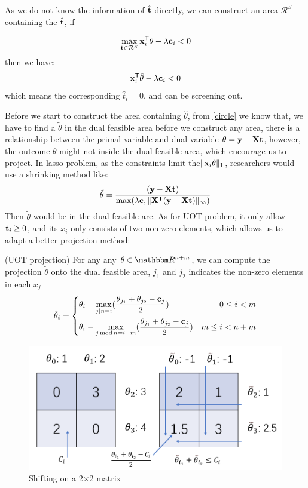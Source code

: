 As we do not know the information of $\hat{\mathbf t}$ directly, we can construct an area $\mathcal{R}^{S}$ containing the $\hat{\mathbf t}$, if

\begin{equation}
\max_{\mathbf t \in \mathcal{R}^S} \mathbf{x}_i^{\mathsf T}\theta -\lambda \mathbf c_i  < 0
\end{equation}
then we have:
 \begin{equation}
 \mathbf{x}_i^{\mathsf T}\hat{\theta} -\lambda \mathbf c_i  < 0
\end{equation}
which means the corresponding $\hat{t}_i = 0$, and can be screening out.

Before we start to construct the area containing $\hat{\theta}$, from \ref{circle} we know that, we have to find a $\tilde{\theta}$ in the dual feasible area before we construct any area, there is a relationship between the primal variable and dual variable $\theta = \mathbf y - \mathbf{X}\mathbf t$, however, the outcome $\theta$ might not inside the dual feasible area, which encourage us to project. In lasso problem, as the constraints limit the$\|\mathbf{x}_i \theta\|_1$,  researchers would use a shrinking method like: 
\begin{equation}
\tilde{\theta} = \frac{(\mathbf y - \mathbf{X} \mathbf t)}{\max(\lambda \mathbf c, \|\mathbf{X}^{\mathsf T}(\mathbf y-\mathbf{X}\mathbf t)\|_{\infty})}
\end{equation}
Then $\tilde{\theta}$ would be in the dual feasible are. As for UOT problem, it only allow $\mathbf t_i \geq 0$, and its $x_i$ only consists of two non-zero elements, which allows us to adapt a better projection method:


\begin{thm}
(UOT projection) For any any $\theta \in \R^{n+m}$, we can compute the projection $\tilde{\theta}$ onto the dual feasible area, $j_1$ and $j_2$ indicates the non-zero elements in each $x_j$
 \begin{equation}
		\tilde{\theta}_{i}=\left\{
	\begin{aligned}
			&\theta_{i} - \max_{j \mid n = i}(\frac{\theta_{j_{1}}+\theta_{j_{2}}-\mathbf c_j}{2}) & 0\leq i<m\\
			&\theta_{i} - \max_{j \operatorname{mod} n= i-m}(\frac{\theta_{j_{1}}+\theta_{j_{2}}-\mathbf c_j}{2}) & m\leq i<n+m
	\end{aligned}
	\right.
 \end{equation}
\end{thm}
	\begin{figure}[htbp]
	\begin{center}	
	\includegraphics[width=0.8\hsize]{pic/shifting}
	\caption{Shifting on a 2$\times$2 matrix}
	\end{center}	
	\end{figure}

